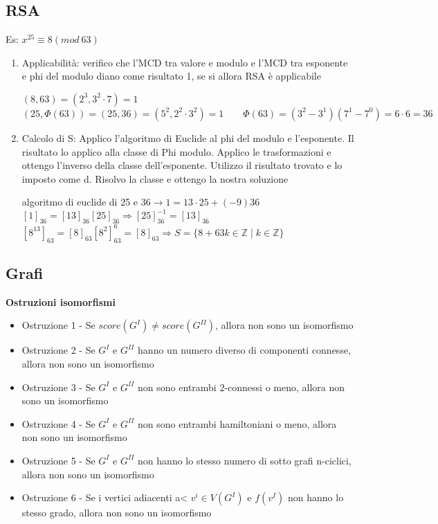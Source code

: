 \documentclass[11pt, letterpaper]{article}
\begin{document}
\subsection{RSA}
Es: $x^{25}\equiv 8(mod\ 63)$
\begin{enumerate}
    \item Applicabilità: verifico che l'MCD tra valore e modulo e l'MCD tra esponente e phi del modulo 
    diano come risultato 1, se si allora RSA è applicabile
    \begin{center}
        $(8,63)=(2^{3},3^{2}\cdot 7)=1$\\
        $(25,\Phi(63))=(25,36)=(5^{2},2^{2}\cdot 3^{2})=1\qquad \Phi(63)=(3^{2}-3^{1})(7^{1}-7^{0})
        =6\cdot 6=36$
    \end{center}
    \item Calcolo di S: Applico l'algoritmo di Euclide al phi del modulo e l'esponente. Il risultato lo applico
    alla classe di Phi modulo. Applico le trasformazioni e ottengo l'inverso della classe dell'esponente.
    Utilizzo il risultato trovato e lo imposto come d. Risolvo la classe e ottengo la nostra soluzione
    \begin{center}
        algoritmo di euclide di 25 e 36$\rightarrow 1=13\cdot25+(-9)36$\\
        $[1]_{36}=[13]_{36}[25]_{36}\Rightarrow [25]^{-1}_{36}=[13]_{36}$\\
        $[8^{13}]_{63}=[8]_{63}[8^{2}]^{6}_{63}=[8]_{63}\Rightarrow S=\{8+63k\in\mathbb{Z}\mid 
        k\in\mathbb{Z}\}$
    \end{center}
\end{enumerate}
\subsection{Grafi}
\textbf{Ostruzioni isomorfismi}
\begin{itemize}
    \item Ostruzione 1 - Se  $score(G^{I})\neq score(G^{II})$, allora non sono un isomorfismo
    \item Ostruzione 2 - Se $G^{I}$ e $G^{II}$ hanno un numero diverso di componenti connesse, allora non sono
    un isomorfismo
    \item Ostruzione 3 - Se $G^{I}$ e $G^{II}$ non sono entrambi 2-connessi o meno, allora non sono un isomorfismo  
    \item Ostruzione 4 - Se $G^{I}$ e $G^{II}$ non sono entrambi hamiltoniani o meno, allora non sono un 
    isomorfismo
    \item Ostruzione 5 - Se $G^{I}$ e $G^{II}$ non hanno lo stesso numero di sotto grafi n-ciclici, allora non sono
     un isomorfismo
    \item Ostruzione 6 - Se i vertici adiacenti a< $v^{i}\in V(G^{I})$ e $f(v^{I})$ non hanno lo stesso grado, 
    allora non sono un isomorfismo
\end{itemize}
\end{document}
